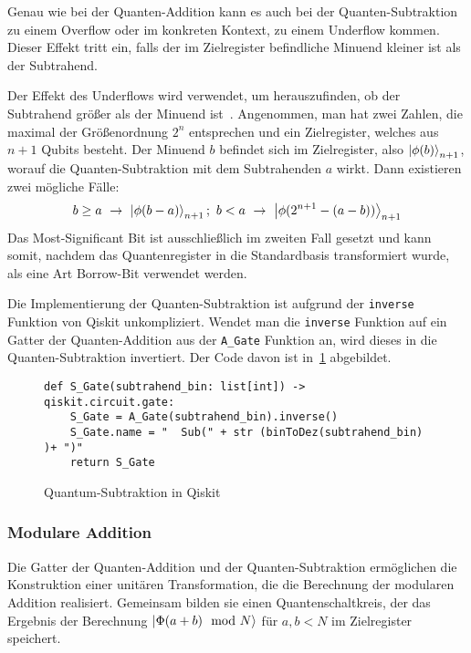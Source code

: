 Genau wie bei der Quanten-Addition kann es auch bei der Quanten-Subtraktion zu einem Overflow
oder im konkreten Kontext, zu einem Underflow kommen.
Dieser Effekt tritt ein, 
falls der im Zielregister befindliche Minuend kleiner ist als der Subtrahend.

Der Effekt des Underflows wird verwendet, um herauszufinden, 
ob der Subtrahend größer als der Minuend ist~\cite{beauregard2003circuit}.
Angenommen, man hat zwei Zahlen, 
die maximal der Größenordnung \(2^n\) entsprechen und 
ein Zielregister, 
welches aus \(n+1\) Qubits besteht.
Der Minuend \(b\) befindet sich im Zielregister, 
also \(\ket{\phi(b)}_{n+1}\), 
worauf die Quanten-Subtraktion mit dem Subtrahenden \(a\) wirkt.
Dann existieren zwei mögliche Fälle:
\[b \geq a~\rightarrow~\ket{\phi(b-a)}_{n+1};~
b < a~\rightarrow~\ket{\phi(2^{n+1}-(a-b))}_{n+1}
  \]
Das Most-Significant Bit ist ausschließlich im zweiten Fall gesetzt und kann somit, 
nachdem das Quantenregister in die Standardbasis transformiert wurde, 
als eine Art Borrow-Bit verwendet werden.

Die Implementierung der Quanten-Subtraktion ist aufgrund der \texttt{inverse} Funktion von Qiskit unkompliziert.
Wendet man die \texttt{inverse} Funktion auf ein Gatter der Quanten-Addition aus der \texttt{A\_Gate} Funktion an, 
wird dieses in die Quanten-Subtraktion invertiert.
Der Code davon ist in~\ref{code:QuantumSub} abgebildet.
\begin{figure}[H]
  \caption{Quantum-Subtraktion in Qiskit}
  \label{code:QuantumSub}
\begin{verbatim}    
def S_Gate(subtrahend_bin: list[int]) -> qiskit.circuit.gate:
    S_Gate = A_Gate(subtrahend_bin).inverse()
    S_Gate.name = "  Sub(" + str (binToDez(subtrahend_bin) )+ ")"
    return S_Gate
  \end{verbatim}
\end{figure}

\subsubsection{Modulare Addition} \label{sub:modulareAddition}
Die Gatter der Quanten-Addition und der Quanten-Subtraktion ermöglichen die Konstruktion einer unitären Transformation, 
die die Berechnung der modularen Addition realisiert.
Gemeinsam bilden sie einen Quantenschaltkreis, 
der das Ergebnis der Berechnung \(\ket{\Phi(a+b)\mod N}\) für \(a, b < N\) im Zielregister speichert.

